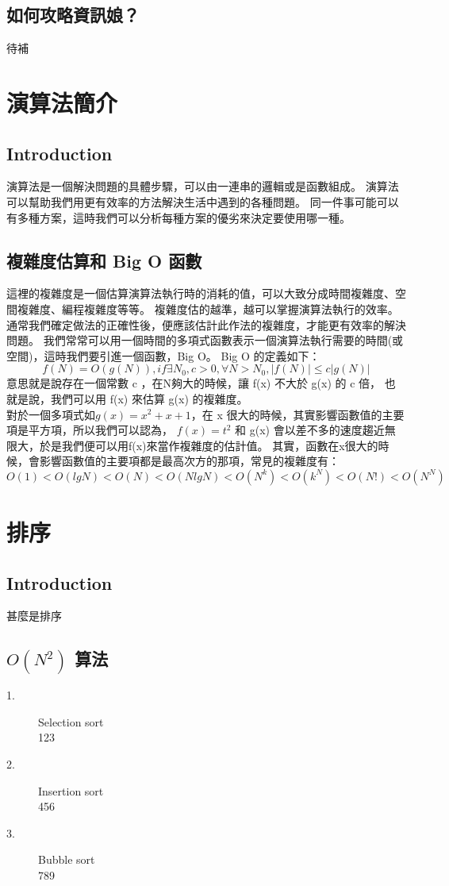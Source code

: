 \documentclass{article}
\begin{document}
\subsection{如何攻略資訊娘？}
待補


\section{演算法簡介}

\subsection{Introduction}
演算法是一個解決問題的具體步驟，可以由一連串的邏輯或是函數組成。
演算法可以幫助我們用更有效率的方法解決生活中遇到的各種問題。
同一件事可能可以有多種方案，這時我們可以分析每種方案的優劣來決定要使用哪一種。

\subsection{複雜度估算和 Big O 函數}
這裡的複雜度是一個估算演算法執行時的消耗的值，可以大致分成時間複雜度、空間複雜度、編程複雜度等等。
複雜度估的越準，越可以掌握演算法執行的效率。
通常我們確定做法的正確性後，便應該估計此作法的複雜度，才能更有效率的解決問題。
我們常常可以用一個時間的多項式函數表示一個演算法執行需要的時間(或空間)，這時我們要引進一個函數，Big O。
Big O 的定義如下：\[f(N) = O(g(N)), if \exists N_0, c > 0,  \forall N > N_0, |f(N)| ≤ c|g(N)|\]
意思就是說存在一個常數 c ，在N夠大的時候，讓 f(x) 不大於 g(x) 的 c 倍，
也就是說，我們可以用 f(x) 來估算 g(x) 的複雜度。\\
對於一個多項式如$g(x) = x^2 + x + 1$，在 x 很大的時候，其實影響函數值的主要項是平方項，所以我們可以認為，
$f(x) = t^2$ 和 g(x) 會以差不多的速度趨近無限大，於是我們便可以用f(x)來當作複雜度的估計值。
其實，函數在x很大的時候，會影響函數值的主要項都是最高次方的那項，常見的複雜度有：
\[O(1) < O(lg N) < O(N) < O(N lg N) < O(N^k) < O(k^N ) < O(N!) < O(N^N)\]


\section{排序}

\subsection*{Introduction}
甚麼是排序

\subsection{ $O(N^2)$ 算法}
\begin{description}
\item[ 1.]Selection sort\\
123
\item[ 2.]Insertion sort\\
456
\item[ 3.]Bubble sort\\
789
\end{description} 
\end{document}
